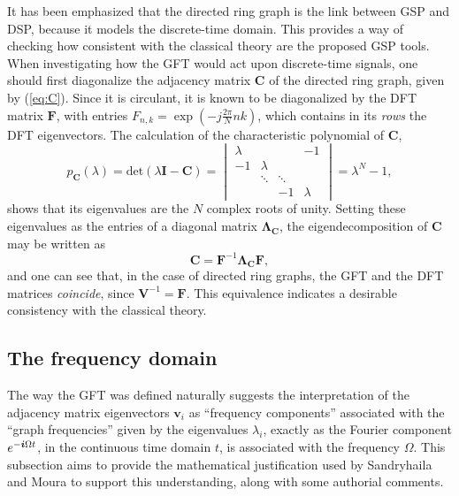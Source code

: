 It has been emphasized that the directed ring graph is the link between GSP and DSP, because it models the discrete-time domain. This provides a way of checking how consistent with the classical theory are the proposed GSP tools. When investigating how the GFT would act upon discrete-time signals, one should first diagonalize the adjacency matrix $ \mathbf{C} $ of the directed ring graph, given by (\ref{eq:C}). Since it is circulant, it is known to be diagonalized by the DFT matrix $ \mathbf{F} $, with entries $ F_{n,k} = \exp \left( -j\frac{2 \pi}{N} nk \right) $, which contains in its \emph{rows} the DFT eigenvectors. The calculation of the characteristic polynomial of $ \mathbf{C} $,
\begin{equation}
p_{\mathbf{C}}(\lambda) = \text{det} (\lambda \mathbf{I} - \mathbf{C}) =
\begin{vmatrix}
\lambda &  &  &   -1\\ 
-1 & \lambda &   & \\ 
&   \ddots & \ddots & \\ 
&  &   -1 & \lambda
\end{vmatrix}
=\lambda^N - 1,
\end{equation}
shows that its eigenvalues are the $ N $ complex roots of unity. Setting these eigenvalues as the entries of a diagonal matrix $ \mathbf{\Lambda}_{\mathbf{C}} $, the eigendecomposition of $ \mathbf{C} $ may be written as
\begin{equation}\label{eq:diag_C}
\mathbf{C} = \mathbf{F}^{-1} \mathbf{\Lambda}_{\mathbf{C}} \mathbf{F},
\end{equation}
and one can see that, in the case of directed ring graphs, the GFT and the DFT matrices \emph{coincide}, since $ \mathbf{V}^{-1} = \mathbf{F} $. This equivalence indicates a desirable consistency with the classical theory.

 \subsection{The frequency domain}

The way the GFT was defined naturally suggests the interpretation of the adjacency matrix eigenvectors $ \mathbf{v}_i $ as ``frequency components'' associated with the ``graph frequencies'' given by the eigenvalues $ \lambda_i $, exactly as the Fourier component $ e^{-\boldsymbol{i} \Omega t} $, in the continuous time domain $ t $, is associated with the frequency $ \Omega $. This subsection aims to provide the mathematical justification used by Sandryhaila and Moura \cite{sandryhaila2014frequency} to support this understanding, along with some authorial comments.

